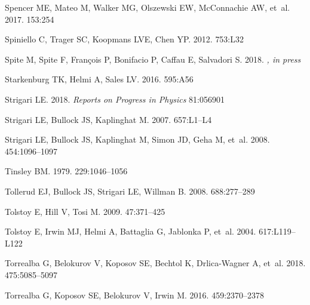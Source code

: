 \documentclass[a4paper]{ar-1col}
\begin{document}
\begin{thebibliography}{}
{Spencer} ME, {Mateo} M, {Walker} MG, {Olszewski} EW, {McConnachie} AW, et~al.
  2017.
\textit{\aj} 153:254

{Spiniello} C, {Trager} SC, {Koopmans} LVE, {Chen} YP. 2012.
\textit{\apjl} 753:L32

{Spite} M, {Spite} F, {Fran{\c c}ois} P, {Bonifacio} P, {Caffau} E, {Salvadori}
  S. 2018.
\textit{\aap, in press}

{Starkenburg} TK, {Helmi} A, {Sales} LV. 2016.
\textit{\aap} 595:A56

{Strigari} LE. 2018.
\textit{Reports on Progress in Physics} 81:056901

{Strigari} LE, {Bullock} JS, {Kaplinghat} M. 2007.
\textit{\apjl} 657:L1--L4

{Strigari} LE, {Bullock} JS, {Kaplinghat} M, {Simon} JD, {Geha} M, et~al. 2008.
\textit{\nat} 454:1096--1097

{Tinsley} BM. 1979.
\textit{\apj} 229:1046--1056

{Tollerud} EJ, {Bullock} JS, {Strigari} LE, {Willman} B. 2008.
\textit{\apj} 688:277--289

{Tolstoy} E, {Hill} V, {Tosi} M. 2009.
\textit{\araa} 47:371--425

{Tolstoy} E, {Irwin} MJ, {Helmi} A, {Battaglia} G, {Jablonka} P, et~al. 2004.
\textit{\apjl} 617:L119--L122

{Torrealba} G, {Belokurov} V, {Koposov} SE, {Bechtol} K, {Drlica-Wagner} A,
  et~al. 2018.
\textit{\mnras} 475:5085--5097

{Torrealba} G, {Koposov} SE, {Belokurov} V, {Irwin} M. 2016{}.
\textit{\mnras} 459:2370--2378


\end{thebibliography}
\end{document}
